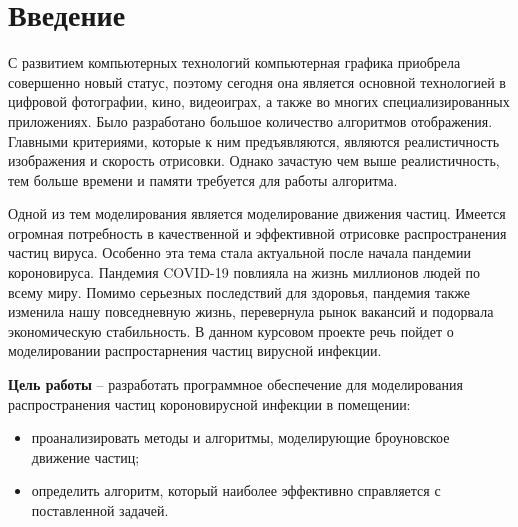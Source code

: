\chapter*{Введение}

 С развитием компьютерных технологий компьютерная графика приобрела совершенно новый статус, поэтому сегодня она является основной технологией в цифровой фотографии, кино, видеоиграх, а также во многих специализированных приложениях. Было разработано большое количество алгоритмов отображения. Главными критериями, которые к ним предъявляются, являются реалистичность изображения и скорость отрисовки. Однако зачастую чем выше реалистичность, тем больше времени и памяти требуется для работы алгоритма.

Одной из тем моделирования является моделирование движения частиц. Имеется огромная потребность в качественной и эффективной отрисовке распространения частиц вируса. Особенно эта тема стала актуальной после начала пандемии короновируса. Пандемия COVID-19 повлияла на жизнь миллионов людей по всему миру. Помимо серьезных последствий для здоровья, пандемия также изменила нашу повседневную жизнь, перевернула рынок вакансий и подорвала экономическую стабильность. В данном курсовом проекте речь пойдет о моделировании распростарнения частиц вирусной инфекции.

\textbf{Цель работы} -- разработать программное обеспечение для моделирования распространения частиц короновирусной инфекции в помещении:

\begin{itemize}
	\item проанализировать методы и алгоритмы, моделирующие броуновское движение частиц; 
	\item определить алгоритм, который наиболее эффективно справляется с поставленной задачей.
\end{itemize}
